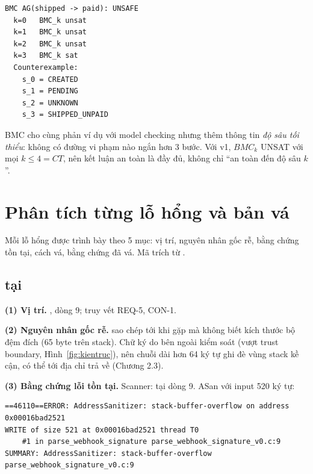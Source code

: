 \begin{lstlisting}[style=logstyle,caption={Truy vết BMC cho $\mathbf{AG}(\mathit{shipped}\rightarrow\mathit{paid})$ trên v0 (trích \code{logs/bmc.txt}).}]
BMC AG(shipped -> paid): UNSAFE
  k=0   BMC_k unsat
  k=1   BMC_k unsat
  k=2   BMC_k unsat
  k=3   BMC_k sat
  Counterexample:
    s_0 = CREATED
    s_1 = PENDING
    s_2 = UNKNOWN
    s_3 = SHIPPED_UNPAID
\end{lstlisting}
BMC cho cùng phản ví dụ với model checking nhưng thêm thông tin \emph{độ sâu tối thiểu}: không
có đường vi phạm nào ngắn hơn 3 bước. Với v1, $\mathit{BMC}_k$ UNSAT với mọi $k \le 4 = CT$, nên
kết luận an toàn là đầy đủ, không chỉ ``an toàn đến độ sâu $k$''.

\section{Phân tích từng lỗ hổng và bản vá}
\label{sec:cwe}
Mỗi lỗ hổng được trình bày theo 5 mục: vị trí, nguyên nhân gốc rễ, bằng chứng tồn tại, cách vá,
bằng chứng đã vá. Mã trích từ .

\subsection{ tại }
\textbf{(1) Vị trí.} , dòng 9; truy vết REQ-5, CON-1.

\textbf{(2) Nguyên nhân gốc rễ.}  sao chép tới khi gặp  mà
không biết kích thước bộ đệm đích (65 byte trên stack). Chữ ký do bên ngoài kiểm soát (vượt trust
boundary, Hình~\ref{fig:kientruc}), nên chuỗi dài hơn 64 ký tự ghi đè vùng stack kề cận, có thể
tới địa chỉ trả về (Chương 2.3).

\textbf{(3) Bằng chứng lỗi tồn tại.} Scanner:  tại dòng 9. ASan với
input 520 ký tự:
\begin{lstlisting}[style=logstyle,caption={Trích \code{logs/sanitizer\_parse\_webhook\_signature\_v0.log}.}]
==46110==ERROR: AddressSanitizer: stack-buffer-overflow on address 0x00016bad2521
WRITE of size 521 at 0x00016bad2521 thread T0
    #1 in parse_webhook_signature parse_webhook_signature_v0.c:9
SUMMARY: AddressSanitizer: stack-buffer-overflow parse_webhook_signature_v0.c:9
\end{lstlisting}

